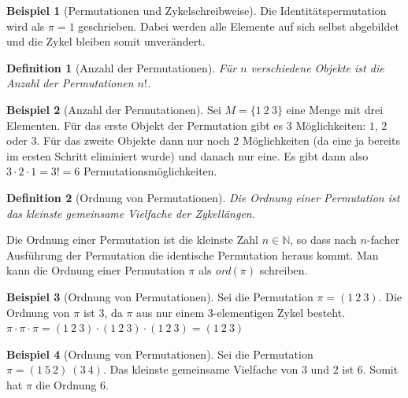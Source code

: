 \documentclass[12pt,a4paper, usenames, dvipsnames]{article}
\theoremstyle{mystyle}
\newtheorem{definition}{Definition}
\theoremstyle{definition}
\newtheorem{bsp}{Beispiel}[definition]
\begin{document}
\begin{bsp}[Permutationen und Zykelschreibweise]
Die Identitätspermutation wird als $\pi = 1$ geschrieben. Dabei werden alle Elemente auf sich selbst abgebildet und die Zykel bleiben somit unverändert.
\end{bsp}

\begin{definition}[Anzahl der Permutationen]
Für $n$ verschiedene Objekte ist die Anzahl der Permutationen $n!$.
\end{definition}

\begin{bsp}[Anzahl der Permutationen]
Sei $M = \{ 1 \ 2 \ 3 \}$ eine Menge mit drei Elementen. Für das erste Objekt der Permutation gibt es $3$ Möglichkeiten: $1$, $2$ oder $3$. Für das zweite Objekte dann nur noch $2$ Möglichkeiten (da eine ja bereits im ersten Schritt eliminiert wurde) und danach nur eine. Es gibt dann also $3 \cdot 2 \cdot 1 = 3! = 6$ Permutationsmöglichkeiten.

\end{bsp}

\begin{definition}[Ordnung von Permutationen]

Die Ordnung einer Permutation ist das kleinste gemeinsame Vielfache der Zykellängen.

\end{definition}

Die Ordnung einer Permutation ist die kleinste Zahl $n \in \mathbb{N}$, so dass nach $n$-facher Ausführung der Permutation die identische Permutation heraus kommt. Man kann die Ordnung einer Permutation $\pi$ als \textit{ord}$(\pi)$ schreiben.

\begin{bsp}[Ordnung von Permutationen]

Sei die Permutation $\pi = (1 \ 2 \ 3)$. Die Ordnung von $\pi$ ist 3, da $\pi$ aus nur einem 3-elementigen Zykel besteht. $\pi \cdot \pi \cdot \pi = (1 \ 2 \ 3) \cdot (1 \ 2 \ 3) \cdot (1 \ 2 \ 3) =  (1 \ 2 \ 3) $

\end{bsp}

\begin{bsp}[Ordnung von Permutationen]

Sei die Permutation $\pi = (1 \ 5 \ 2)\ (3 \ 4)$. Das kleinste gemeinsame Vielfache von $3$ und $2$ ist 6. Somit hat $\pi$ die Ordnung 6.

\end{bsp}
%
%
%
%
%
%
%
%
%
%
%
%
%
\end{document}
